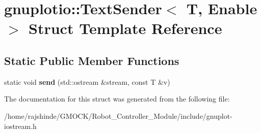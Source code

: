 \hypertarget{structgnuplotio_1_1_text_sender}{}\section{gnuplotio\+:\+:Text\+Sender$<$ T, Enable $>$ Struct Template Reference}
\label{structgnuplotio_1_1_text_sender}
\subsection*{Static Public Member Functions}
\begin{DoxyCompactItemize}
\item 
static void {\bfseries send} (std\+::ostream \&stream, const T \&v)\hypertarget{structgnuplotio_1_1_text_sender_a03b58292dc75a4137d30ad7fffd762c6}{}\label{structgnuplotio_1_1_text_sender_a03b58292dc75a4137d30ad7fffd762c6}

\end{DoxyCompactItemize}


The documentation for this struct was generated from the following file\+:\begin{DoxyCompactItemize}
\item 
/home/rajshinde/\+G\+M\+O\+C\+K/\+Robot\+\_\+\+Controller\+\_\+\+Module/include/gnuplot-\/iostream.\+h\end{DoxyCompactItemize}
